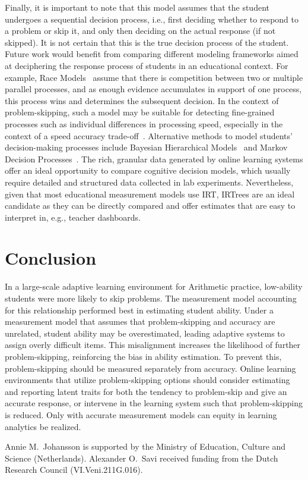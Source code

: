 \documentclass[anonymous,manuscript,review]{acmart}
\begin{document}
Finally, it is important to note that this model assumes that the student undergoes a sequential decision process, i.e., first deciding whether to respond to a problem or skip it, and only then deciding on the actual response (if not skipped). It is not certain that this is the true decision process of the student. Future work would benefit from comparing different modeling frameworks aimed at deciphering the response process of students in an educational context. For example, Race Models~\cite{heathcote2022winner} assume that there is competition between two or multiple parallel processes, and as enough evidence accumulates in support of one process, this process wins and determines the subsequent decision. In the context of problem-skipping, such a model may be suitable for detecting fine-grained processes such as individual differences in processing speed, especially in the context of a speed accuracy trade-off~\cite{heathcote2022winner, evans2018modeling}. Alternative methods to model students' decision-making processes include Bayesian Hierarchical Models~\cite{sawyer2018modeling, lee2014bayesian} and Markov Decision Processes~\cite{lamar2018markov, puterman1994markov}. The rich, granular data generated by online learning systems offer an ideal opportunity to compare cognitive decision models, which usually require detailed and structured data collected in lab experiments. Nevertheless, given that most educational measurement models use IRT, IRTrees are an ideal candidate as they can be directly compared and offer estimates that are easy to interpret in, e.g., teacher dashboards.

\section{Conclusion}
In a large-scale adaptive learning environment for Arithmetic practice, low-ability students were more likely to skip problems. The measurement model accounting for this relationship performed best in estimating student ability. Under a measurement model that assumes that problem-skipping and accuracy are unrelated, student ability may be overestimated, leading adaptive systems to assign overly difficult items. This misalignment increases the likelihood of further problem-skipping, reinforcing the bias in ability estimation. To prevent this, problem-skipping should be measured separately from accuracy. Online learning environments that utilize problem-skipping options should consider estimating and reporting latent traits for both the tendency to problem-skip and give an accurate response, or intervene in the learning system such that problem-skipping is reduced. Only with accurate measurement models can equity in learning analytics be realized. 

\begin{acks}
    Annie M.\ Johansson is supported by the Ministry of Education, Culture and Science (Netherlands). Alexander O.\ Savi received funding from the Dutch Research Council (VI.Veni.211G.016).
\end{acks}




\end{document}
